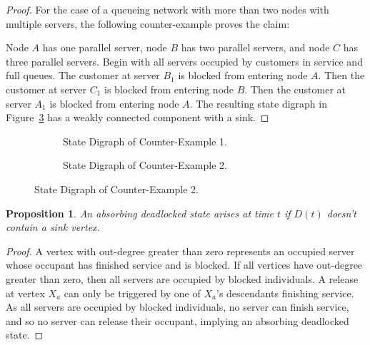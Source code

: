 \documentclass{article}
\newtheorem{proposition}{Proposition}
\begin{document}
\begin{proof}
For the case of a queueing network with more than two nodes with multiple servers, the following counter-example proves the claim:

Node $A$ has one parallel server, node $B$ has two parallel servers, and node $C$ has three parallel servers.
Begin with all servers occupied by customers in service and full queues.
The customer at server $B_1$ is blocked from entering node $A$.
Then the customer at server $C_1$ is blocked from entering node $B$.
Then the customer at server $A_1$ is blocked from entering node $A$.
The resulting state digraph in Figure~\ref{fig:counter_example_2} has a weakly connected component with a sink.

\end{proof}

\begin{figure}
\begin{subfigure}{0.5\textwidth}
\begin{center}

\end{center}
\caption{State Digraph of Counter-Example 1.}
\label{fig:counter_example_1}
\end{subfigure}
\begin{subfigure}{0.5\textwidth}
\begin{center}

\end{center}
\caption{State Digraph of Counter-Example 2.}
\label{fig:counter_example_2}
\end{subfigure}
\end{figure}

\begin{proposition}
An absorbing deadlocked state arises at time $t$ if $D(t)$ doesn't contain a sink vertex.
\end{proposition}

\begin{proof}
A vertex with out-degree greater than zero represents an occupied server whose occupant has finished service and is blocked.
If all vertices have out-degree greater than zero, then all servers are occupied by blocked individuals.
A release at vertex $X_a$ can only be triggered by one of $X_a$'s descendants finishing service.
As all servers are occupied by blocked individuals, no server can finish service, and so no server can release their occupant, implying an absorbing deadlocked state.

\end{proof}
\end{document}
